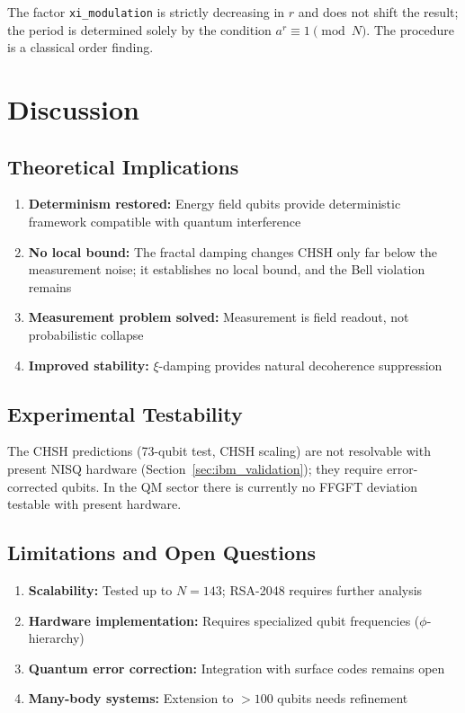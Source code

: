 The factor \texttt{xi\_modulation} is strictly decreasing in $r$ and does not shift the result; the period is determined solely by the condition $a^r \equiv 1 \pmod{N}$. The procedure is a classical order finding.

\section{Discussion}

\subsection{Theoretical Implications}

\begin{enumerate}
	\item \textbf{Determinism restored:} Energy field qubits provide deterministic framework compatible with quantum interference
	\item \textbf{No local bound:} The fractal damping changes CHSH only far below the measurement noise; it establishes no local bound, and the Bell violation remains
	\item \textbf{Measurement problem solved:} Measurement is field readout, not probabilistic collapse
	\item \textbf{Improved stability:} $\xi$-damping provides natural decoherence suppression
\end{enumerate}

\subsection{Experimental Testability}

The CHSH predictions (73-qubit test, CHSH scaling) are not resolvable with present NISQ hardware (Section~\ref{sec:ibm_validation}); they require error-corrected qubits. In the QM sector there is currently no FFGFT deviation testable with present hardware.

\subsection{Limitations and Open Questions}

\begin{enumerate}
	\item \textbf{Scalability:} Tested up to $N=143$; RSA-2048 requires further analysis
	\item \textbf{Hardware implementation:} Requires specialized qubit frequencies ($\phi$-hierarchy)
	\item \textbf{Quantum error correction:} Integration with surface codes remains open
	\item \textbf{Many-body systems:} Extension to $>100$ qubits needs refinement
\end{enumerate}

